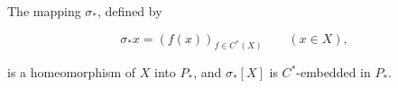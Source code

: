 The mapping $\sigma_*$, defined by

$$\sigma_* x = (f(x))_{f \in C^*(X)} \qquad (x \in X),$$

is a homeomorphism of $X$ into $P_*$, and $\sigma_*[X]$ is $C^*$-embedded in $P_*$.
